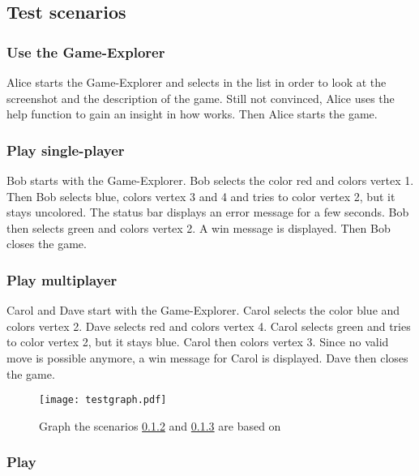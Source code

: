 \subsection{Test scenarios}

\subsubsection{Use the Game-Explorer}

Alice starts the Game-Explorer and selects \graphcoloring in the list in order to look at the screenshot and the description of the game. Still not convinced, Alice uses the help function to gain an insight in how \graphcoloring works. Then Alice starts the game.

\subsubsection{Play \graphcoloring single-player} \label{T:GCSingle}

Bob starts \graphcoloring with the Game-Explorer. Bob selects the color red and colors vertex 1. Then Bob selects blue, colors vertex 3 and 4 and tries to color vertex 2, but it stays uncolored. The status bar displays an error message for a few seconds. Bob then selects green and colors vertex 2. A win message is displayed. Then Bob closes the game.

\subsubsection{Play \graphcoloring multiplayer} \label{T:GCMulti}

Carol and Dave start \graphcoloring with the Game-Explorer. Carol selects the color blue and colors vertex 2. Dave selects red and colors vertex 4. Carol selects green and tries to color vertex 2, but it stays blue. Carol then colors vertex 3. Since no valid move is possible anymore, a win message for Carol is displayed. Dave then closes the game.

\begin{figure}[h!]
	\centering
	\texttt{[image: testgraph.pdf]}
	\caption{Graph the scenarios \ref{T:GCSingle} and \ref{T:GCMulti} are based on}
	\label{img:ACTDEV}
\end{figure}

\subsubsection{Play \twixt} \label{T:TwixT}


